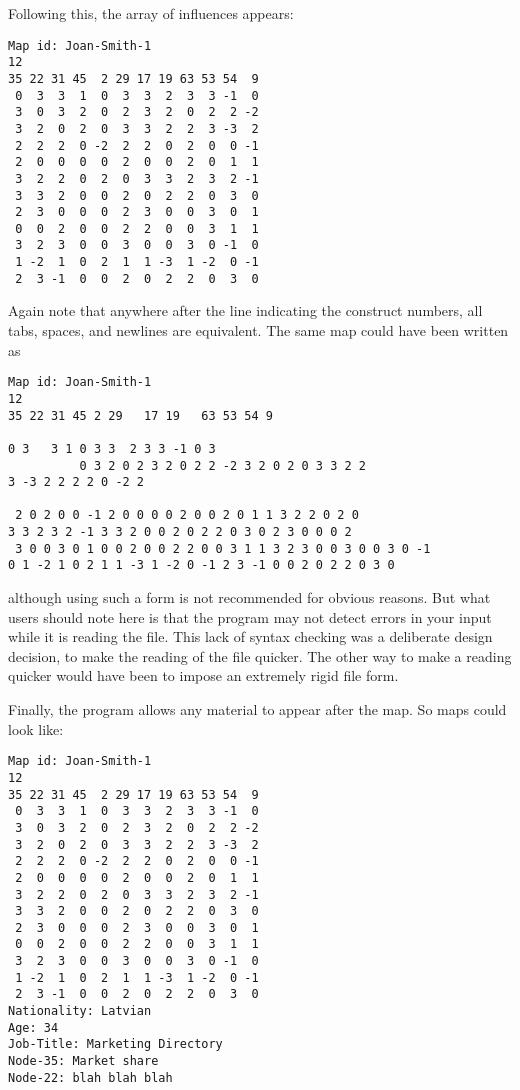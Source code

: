 \documentclass[%
	11pt,
        a4paper,
        twoside]{workrep}
\begin{document}
Following this, the array of influences appears:

\begin{verbatim}
Map id: Joan-Smith-1
12
35 22 31 45  2 29 17 19 63 53 54  9
 0  3  3  1  0  3  3  2  3  3 -1  0
 3  0  3  2  0  2  3  2  0  2  2 -2
 3  2  0  2  0  3  3  2  2  3 -3  2
 2  2  2  0 -2  2  2  0  2  0  0 -1
 2  0  0  0  0  2  0  0  2  0  1  1
 3  2  2  0  2  0  3  3  2  3  2 -1
 3  3  2  0  0  2  0  2  2  0  3  0
 2  3  0  0  0  2  3  0  0  3  0  1
 0  0  2  0  0  2  2  0  0  3  1  1
 3  2  3  0  0  3  0  0  3  0 -1  0
 1 -2  1  0  2  1  1 -3  1 -2  0 -1
 2  3 -1  0  0  2  0  2  2  0  3  0
\end{verbatim}

Again note that anywhere after the line indicating the construct
numbers, all tabs, spaces, and newlines are equivalent.  The same map
could have been written as
\begin{verbatim}
Map id: Joan-Smith-1
12
35 22 31 45 2 29   17 19   63 53 54 9

0 3   3 1 0 3 3  2 3 3 -1 0 3
          0 3 2 0 2 3 2 0 2 2 -2 3 2 0 2 0 3 3 2 2
3 -3 2 2 2 2 0 -2 2

 2 0 2 0 0 -1 2 0 0 0 0 2 0 0 2 0 1 1 3 2 2 0 2 0
3 3 2 3 2 -1 3 3 2 0 0 2 0 2 2 0 3 0 2 3 0 0 0 2
 3 0 0 3 0 1 0 0 2 0 0 2 2 0 0 3 1 1 3 2 3 0 0 3 0 0 3 0 -1
0 1 -2 1 0 2 1 1 -3 1 -2 0 -1 2 3 -1 0 0 2 0 2 2 0 3 0
\end{verbatim}
although using such a form is not recommended for obvious reasons.
But what users should note here is that the program may not detect
errors in your input while it is reading the file.  This lack of
syntax checking was a deliberate design decision, to make the
reading of the file quicker.  The other way to make a reading
quicker would have been to impose an extremely rigid file form.

Finally, the program allows any material to appear after the map.  So
maps could look like:

\begin{verbatim}
Map id: Joan-Smith-1
12
35 22 31 45  2 29 17 19 63 53 54  9
 0  3  3  1  0  3  3  2  3  3 -1  0
 3  0  3  2  0  2  3  2  0  2  2 -2
 3  2  0  2  0  3  3  2  2  3 -3  2
 2  2  2  0 -2  2  2  0  2  0  0 -1
 2  0  0  0  0  2  0  0  2  0  1  1
 3  2  2  0  2  0  3  3  2  3  2 -1
 3  3  2  0  0  2  0  2  2  0  3  0
 2  3  0  0  0  2  3  0  0  3  0  1
 0  0  2  0  0  2  2  0  0  3  1  1
 3  2  3  0  0  3  0  0  3  0 -1  0
 1 -2  1  0  2  1  1 -3  1 -2  0 -1
 2  3 -1  0  0  2  0  2  2  0  3  0
Nationality: Latvian
Age: 34
Job-Title: Marketing Directory
Node-35: Market share
Node-22: blah blah blah
\end{verbatim}
\end{document}
